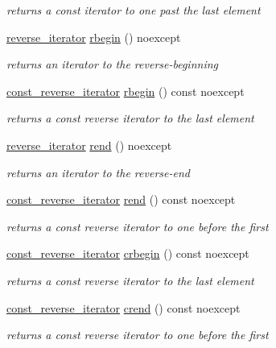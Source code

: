 \begin{DoxyCompactItemize}
\begin{DoxyCompactList}\small\item\em returns a const iterator to one past the last element \end{DoxyCompactList}\item 
\hyperlink{classnlohmann_1_1basic__json_a2f1f83aa187a56dc5ec7a7027065ac8a}{reverse\-\_\-iterator} \hyperlink{classnlohmann_1_1basic__json_a62ccf5b9b3674aec2403fbc02da03db8}{rbegin} () noexcept
\begin{DoxyCompactList}\small\item\em returns an iterator to the reverse-\/beginning \end{DoxyCompactList}\item 
\hyperlink{classnlohmann_1_1basic__json_ae336fff01f4b78e3e16e5008dc8dbc00}{const\-\_\-reverse\-\_\-iterator} \hyperlink{classnlohmann_1_1basic__json_a15e70a44e2a8db929694819fed256653}{rbegin} () const noexcept
\begin{DoxyCompactList}\small\item\em returns a const reverse iterator to the last element \end{DoxyCompactList}\item 
\hyperlink{classnlohmann_1_1basic__json_a2f1f83aa187a56dc5ec7a7027065ac8a}{reverse\-\_\-iterator} \hyperlink{classnlohmann_1_1basic__json_aaa160a960dd3dd90856a72b1d8dbe707}{rend} () noexcept
\begin{DoxyCompactList}\small\item\em returns an iterator to the reverse-\/end \end{DoxyCompactList}\item 
\hyperlink{classnlohmann_1_1basic__json_ae336fff01f4b78e3e16e5008dc8dbc00}{const\-\_\-reverse\-\_\-iterator} \hyperlink{classnlohmann_1_1basic__json_a36fda9749be288cac96cfd846cb62561}{rend} () const noexcept
\begin{DoxyCompactList}\small\item\em returns a const reverse iterator to one before the first \end{DoxyCompactList}\item 
\hyperlink{classnlohmann_1_1basic__json_ae336fff01f4b78e3e16e5008dc8dbc00}{const\-\_\-reverse\-\_\-iterator} \hyperlink{classnlohmann_1_1basic__json_a060b33f8f255986088652625f9d50681}{crbegin} () const noexcept
\begin{DoxyCompactList}\small\item\em returns a const reverse iterator to the last element \end{DoxyCompactList}\item 
\hyperlink{classnlohmann_1_1basic__json_ae336fff01f4b78e3e16e5008dc8dbc00}{const\-\_\-reverse\-\_\-iterator} \hyperlink{classnlohmann_1_1basic__json_aa7084e62b93ef0236698b246a58bb2da}{crend} () const noexcept
\begin{DoxyCompactList}\small\item\em returns a const reverse iterator to one before the first \end{DoxyCompactList}\end{DoxyCompactItemize}
